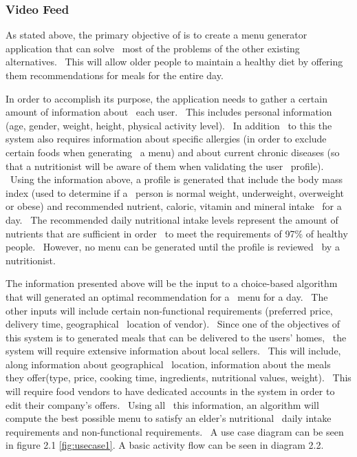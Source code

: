 \subsubsection{Video Feed}




As stated above, the primary objective of \applicationTitle{} is to create a menu generator application that can solve \
most of the problems of the other existing alternatives. \
This will allow older people to maintain a healthy diet by offering them recommendations for meals for the entire day.

In order to accomplish its purpose, the application needs to gather a certain amount of information about \
each user. \
This includes personal information (age, gender, weight, height, physical activity level). \
In addition \
to this the system also requires information about specific allergies (in order to exclude certain foods when generating \
a menu) and about current chronic diseases (so that a nutritionist will be aware of them when validating the user \
profile). \
Using the information above, a profile is generated that include the body mass index (used to determine if a \
person is normal weight, underweight, overweight or obese) and recommended nutrient, caloric, vitamin and mineral intake \
for a day. \
The recommended daily nutritional intake levels represent the amount of nutrients that are sufficient in order \
to meet the requirements of 97\% of healthy people. \
However, no menu can be generated until the profile is reviewed \
by a nutritionist.

The information presented above will be the input to a choice-based algorithm that will generated an optimal recommendation for a \
menu for a day. \
The other inputs will include certain non-functional requirements (preferred price, delivery time, geographical \
location of vendor). \
Since one of the objectives of this system is to generated meals that can be delivered to the users' homes, \
the system will require extensive information about local sellers. \
This will include, along information about geographical \
location, information about the meals they offer(type, price, cooking time, ingredients, nutritional values, weight). \
This will require food vendors to have dedicated accounts in the system in order to edit their company's offers. \
Using all \
this information, an algorithm will compute the best possible menu to satisfy an elder's nutritional \
daily intake requirements and non-functional requirements. \
A use case diagram can be seen in figure 2.1 \ref{fig:usecase1}.
A basic activity flow can be seen in diagram 2.2.

